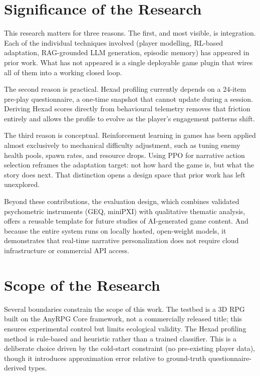 \section{Significance of the Research}

This research matters for three reasons. The first, and most visible, is integration. Each of the individual techniques involved (player modelling, RL-based adaptation, RAG-grounded LLM generation, episodic memory) has appeared in prior work. What has not appeared is a single deployable game plugin that wires all of them into a working closed loop.

The second reason is practical. Hexad profiling currently depends on a 24-item pre-play questionnaire, a one-time snapshot that cannot update during a session. Deriving Hexad scores directly from behavioural telemetry removes that friction entirely and allows the profile to evolve as the player's engagement patterns shift.

The third reason is conceptual. Reinforcement learning in games has been applied almost exclusively to mechanical difficulty adjustment, such as tuning enemy health pools, spawn rates, and resource drops. Using PPO for narrative action selection reframes the adaptation target: not how hard the game is, but what the story does next. That distinction opens a design space that prior work has left unexplored.

Beyond these contributions, the evaluation design, which combines validated psychometric instruments (GEQ, miniPXI) with qualitative thematic analysis, offers a reusable template for future studies of AI-generated game content. And because the entire system runs on locally hosted, open-weight models, it demonstrates that real-time narrative personalization does not require cloud infrastructure or commercial API access.

\section{Scope of the Research}

Several boundaries constrain the scope of this work. The testbed is a 3D RPG built on the AnyRPG Core framework, not a commercially released title; this ensures experimental control but limits ecological validity. The Hexad profiling method is rule-based and heuristic rather than a trained classifier. This is a deliberate choice driven by the cold-start constraint (no pre-existing player data), though it introduces approximation error relative to ground-truth questionnaire-derived types.

